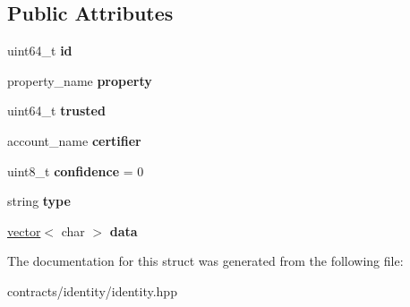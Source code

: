 \subsection*{Public Attributes}
\begin{DoxyCompactItemize}
\item 
\mbox{\label{structidentity_1_1contract_1_1certrow_af7c974614e0aef2b1ba621e8d912dbc8}} 
uint64\+\_\+t {\bfseries id}
\item 
\mbox{\label{structidentity_1_1contract_1_1certrow_a95e80264320f4a931a799216e246c869}} 
property\+\_\+name {\bfseries property}
\item 
\mbox{\label{structidentity_1_1contract_1_1certrow_a40d543da5ea5e936fcd6fefec2a17c11}} 
uint64\+\_\+t {\bfseries trusted}
\item 
\mbox{\label{structidentity_1_1contract_1_1certrow_a81787fe8d450bc7d9891c26006a24f28}} 
account\+\_\+name {\bfseries certifier}
\item 
\mbox{\label{structidentity_1_1contract_1_1certrow_a99eca46af6a22f9bf93620a9dcad2108}} 
uint8\+\_\+t {\bfseries confidence} = 0
\item 
\mbox{\label{structidentity_1_1contract_1_1certrow_a222d9f3eba96e7b910c5f4654556d8d4}} 
string {\bfseries type}
\item 
\mbox{\label{structidentity_1_1contract_1_1certrow_af6e60329a6b17305459b91641a634b27}} 
\mbox{\hyperlink{classstd_1_1vector}{vector}}$<$ char $>$ {\bfseries data}
\end{DoxyCompactItemize}


The documentation for this struct was generated from the following file\+:\begin{DoxyCompactItemize}
\item 
contracts/identity/identity.\+hpp\end{DoxyCompactItemize}
